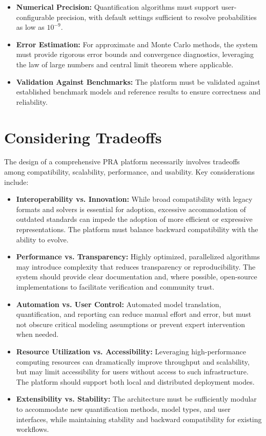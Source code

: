 \begin{itemize}
    \item \textbf{Numerical Precision:} Quantification algorithms must support user-configurable precision, with default settings sufficient to resolve probabilities as low as $10^{-9}$.
    \item \textbf{Error Estimation:} For approximate and Monte Carlo methods, the system must provide rigorous error bounds and convergence diagnostics, leveraging the law of large numbers and central limit theorem where applicable.
    \item \textbf{Validation Against Benchmarks:} The platform must be validated against established benchmark models and reference results to ensure correctness and reliability.
\end{itemize}

\section{Considering Tradeoffs}
\label{sec:tradeoffs}

The design of a comprehensive PRA platform necessarily involves tradeoffs among compatibility, scalability, performance, and usability. Key considerations include:

\begin{itemize}
    \item \textbf{Interoperability vs. Innovation:} While broad compatibility with legacy formats and solvers is essential for adoption, excessive accommodation of outdated standards can impede the adoption of more efficient or expressive representations. The platform must balance backward compatibility with the ability to evolve.
    \item \textbf{Performance vs. Transparency:} Highly optimized, parallelized algorithms may introduce complexity that reduces transparency or reproducibility. The system should provide clear documentation and, where possible, open-source implementations to facilitate verification and community trust.
    \item \textbf{Automation vs. User Control:} Automated model translation, quantification, and reporting can reduce manual effort and error, but must not obscure critical modeling assumptions or prevent expert intervention when needed.
    \item \textbf{Resource Utilization vs. Accessibility:} Leveraging high-performance computing resources can dramatically improve throughput and scalability, but may limit accessibility for users without access to such infrastructure. The platform should support both local and distributed deployment modes.
    \item \textbf{Extensibility vs. Stability:} The architecture must be sufficiently modular to accommodate new quantification methods, model types, and user interfaces, while maintaining stability and backward compatibility for existing workflows.
\end{itemize}

